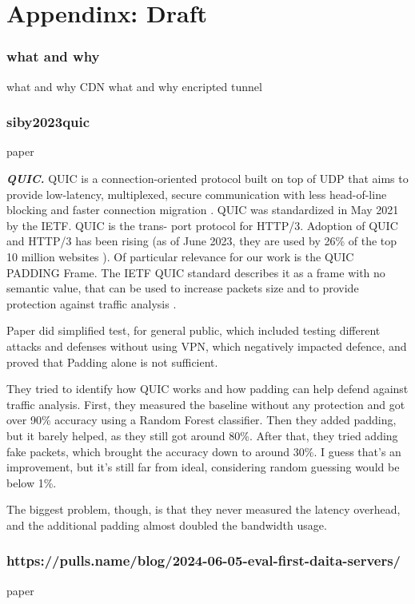 \chapter{Appendinx: Draft}

\subsection{what and why}
what and why CDN
what and why encripted tunnel
\subsection{siby2023quic}
paper~\cite{siby2023quic}

\textbf{\textit{QUIC.}} QUIC is a connection-oriented protocol built on top of UDP
that aims to provide low-latency, multiplexed, secure communication
with less head-of-line blocking and faster connection migration \cite{siby2023quic}\cite{rfc9000}.
QUIC was standardized in May 2021 by the IETF. QUIC is the trans-
port protocol for HTTP/3. Adoption of QUIC and HTTP/3 has been
rising (as of June 2023, they are used by 26\% of the top 10 million
websites \cite{siby2023quic}\cite{w3techs2023http3}). Of particular relevance for our work is the QUIC
PADDING Frame. The IETF QUIC standard describes it as a frame
with no semantic value, that can be used to increase packets size and
to provide protection against traffic analysis \cite{siby2023quic}\cite[\S19.1]{rfc9000}.

Paper did simplified test, for general public, which included testing different attacks and defenses without using VPN, which negatively impacted defence, and proved that Padding alone is not sufficient.

They tried to identify how QUIC works and how padding can help defend against traffic analysis. First, they measured the baseline without any protection and got over 90\% accuracy using a Random Forest classifier. Then they added padding, but it barely helped, as they still got around 80\%. After that, they tried adding fake packets, which brought the accuracy down to around 30\%. I guess that's an improvement, but it's still far from ideal, considering random guessing would be below 1\%.

The biggest problem, though, is that they never measured the latency overhead, and the additional padding almost doubled the bandwidth usage.



\subsection{https://pulls.name/blog/2024-06-05-eval-first-daita-servers/}
paper~\cite{pulls2024daitaeval}

